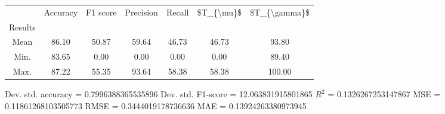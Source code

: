 \begin{tabular}{|c|c|c|c|c|c|c|}
\toprule
{} &  Accuracy &  F1 score &  Precision &  Recall &  \$T\_\{\textbackslash mu\}\$ &  \$T\_\{\textbackslash gamma\}\$ \\
Results &           &           &            &         &            &               \\
\hline
Mean    &     86.10 &     50.87 &      59.64 &   46.73 &      46.73 &         93.80 \\
Min.    &     83.65 &      0.00 &       0.00 &    0.00 &       0.00 &         89.40 \\
Max.    &     87.22 &     55.35 &      93.64 &   58.38 &      58.38 &        100.00 \\
\bottomrule
\end{tabular}

 Dev. std. accuracy = 0.7996388365535896
 Dev. std. F1-score = 12.063831915801865
 $R^2$ = 0.1326267253147867
 MSE = 0.11861268103505773
 RMSE = 0.3444019178736636
 MAE = 0.13924263380973945